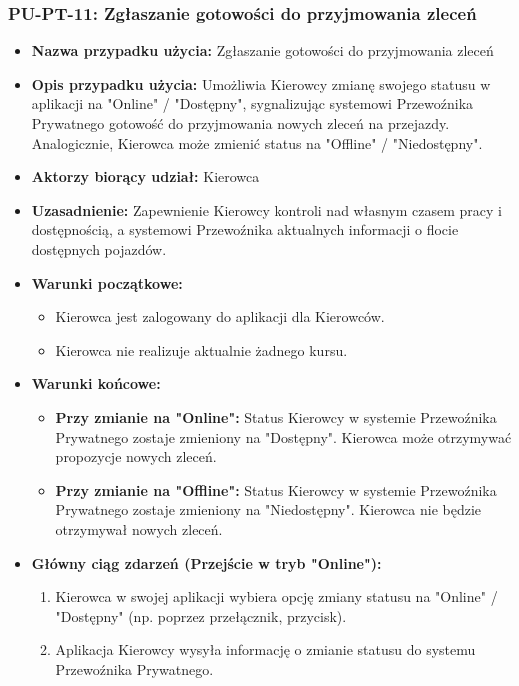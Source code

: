 \documentclass[a4paper,12pt]{article}
\begin{document}
\subsubsection{PU-PT-11: Zgłaszanie gotowości do przyjmowania zleceń}
\begin{itemize}
    \item \textbf{Nazwa przypadku użycia:} Zgłaszanie gotowości do przyjmowania zleceń
    \item \textbf{Opis przypadku użycia:} Umożliwia Kierowcy zmianę swojego statusu w aplikacji na "Online" / "Dostępny", sygnalizując systemowi Przewoźnika Prywatnego gotowość do przyjmowania nowych zleceń na przejazdy. Analogicznie, Kierowca może zmienić status na "Offline" / "Niedostępny".
    \item \textbf{Aktorzy biorący udział:} Kierowca
    \item \textbf{Uzasadnienie:} Zapewnienie Kierowcy kontroli nad własnym czasem pracy i dostępnością, a systemowi Przewoźnika aktualnych informacji o flocie dostępnych pojazdów.
    \item \textbf{Warunki początkowe:}
        \begin{itemize}
            \item Kierowca jest zalogowany do aplikacji dla Kierowców.
            \item Kierowca nie realizuje aktualnie żadnego kursu.
        \end{itemize}
    \item \textbf{Warunki końcowe:}
        \begin{itemize}
            \item \textbf{Przy zmianie na "Online":} Status Kierowcy w systemie Przewoźnika Prywatnego zostaje zmieniony na "Dostępny". Kierowca może otrzymywać propozycje nowych zleceń.
            \item \textbf{Przy zmianie na "Offline":} Status Kierowcy w systemie Przewoźnika Prywatnego zostaje zmieniony na "Niedostępny". Kierowca nie będzie otrzymywał nowych zleceń.
        \end{itemize}
    \item \textbf{Główny ciąg zdarzeń (Przejście w tryb "Online"):}
        \begin{enumerate}
            \item Kierowca w swojej aplikacji wybiera opcję zmiany statusu na "Online" / "Dostępny" (np. poprzez przełącznik, przycisk).
            \item Aplikacja Kierowcy wysyła informację o zmianie statusu do systemu Przewoźnika Prywatnego.

\end{enumerate}
\end{itemize}
\end{document}
